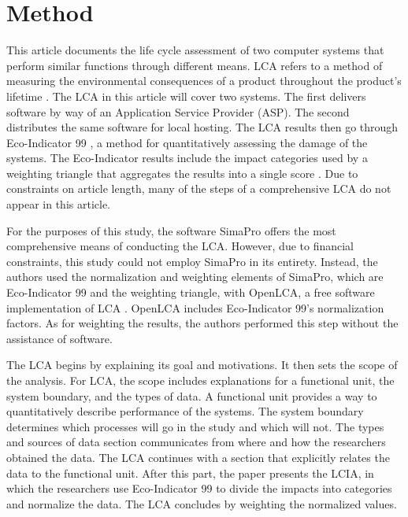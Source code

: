 \documentclass[final,journal,10pt,letterpaper,oneside,twocolumn,compsoc]%
{IEEEtran}
\begin{document}
\section{Method}
This article documents the life cycle assessment of two computer systems
that perform similar functions through different means. LCA refers to a method
of measuring the environmental consequences of a product throughout the
product's
lifetime \cite{14040} \cite{14044}. The LCA in this article will cover two
systems. The first
delivers software by way of an Application Service Provider (ASP). The
second distributes the same software for local hosting. The LCA results then go
through Eco-Indicator 99 \cite{pre}, a method for quantitatively assessing the
damage of the systems. The Eco-Indicator
results include the impact categories used by a weighting triangle that
aggregates the results into a single score \cite{triangle}. Due to constraints
on article length, many of the steps of a comprehensive LCA do not appear in
this article.

For the purposes of this study, the software SimaPro offers the most
comprehensive means of conducting the LCA.
However, due to financial constraints, this study could not employ SimaPro in
its entirety. Instead,
the authors used the normalization and weighting elements of SimaPro, which are
Eco-Indicator 99
and the weighting triangle, with OpenLCA, a free software implementation of LCA
\cite{openlca}. OpenLCA includes Eco-Indicator 99's normalization factors. As
for weighting the results, the
authors performed this step without the assistance of software.

The LCA begins by explaining its goal and motivations. It then sets the scope of
the analysis. For LCA, the scope includes explanations for a functional unit,
the system boundary, and the types of data. A functional unit provides a way to
quantitatively describe performance of the systems. The system boundary
determines which processes will go in the study and which will not. The types
and sources of data section communicates from where and how the researchers
obtained the data. The LCA continues with a section that explicitly relates the
data to the functional unit. After this part, the paper presents the LCIA, in
which the researchers use Eco-Indicator 99 to divide the impacts into categories
and normalize the data. The LCA concludes by weighting the normalized values.
\end{document}
